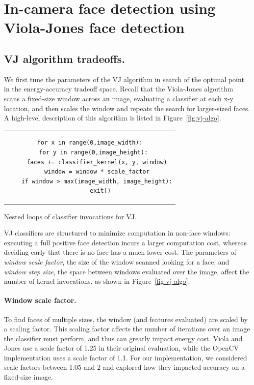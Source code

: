 \section{In-camera face detection using Viola-Jones face detection}

\subsection{VJ algorithm tradeoffs.}
We first tune the parameters of the VJ algorithm in search of the optimal point in the energy-accuracy tradeoff space.
Recall that the Viola-Jones algorithm scans a fixed-size window across an image,
evaluating a classifier at each x-y location, and then scales the window and repeats
the search for larger-sized faces.
A high-level description of this algorithm is listed in Figure~\ref{fig:vj-algo}.

\begin{marginfigure}
\begin{tabular}{c}  %
\begin{lstlisting}
for x in range(0,image_width):
  for y in range(0,image_height):
    faces += classifier_kernel(x, y, window)
    window = window * scale_factor
    if window > max(image_width, image_height):
      exit()
\end{lstlisting}
\end{tabular}
\caption{Nested loops of classifier invocations for VJ.}
\label{fig:vj-algo}
\end{marginfigure}


VJ classifiers are structured to minimize computation in non-face windows: executing a full positive face detection incurs a larger computation cost, whereas deciding early that there is no face has a much lower cost.
The parameters of \textit{window scale factor}, the size of the window scanned looking for a face, and \textit{window step size}, the space between windows evaluated over the image, affect the number of kernel invocations, as shown in Figure~\ref{fig:vj-algo}.

\paragraph{Window scale factor.}
To find faces of
multiple sizes, the window (and features evaluated) are scaled by a scaling factor. This scaling factor
affects the number of iterations over an image the classifier must perform, and thus can greatly impact
energy cost. Viola and Jones use a scale factor of 1.25 in their original evaluation, while the OpenCV
implementation uses a scale factor of 1.1. For our implementation, we considered scale factors between 1.05
and 2 and explored how they impacted accuracy on a fixed-size image.

